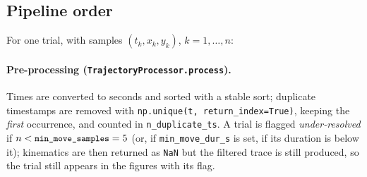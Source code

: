 \documentclass[11pt,a4paper]{article}
\newcommand{\code}[1]{\texttt{\small #1}}
\begin{document}
\subsection{Pipeline order}

For one trial, with samples $(t_k, x_k, y_k)$, $k = 1, \dots, n$:

\paragraph{Pre-processing (\code{TrajectoryProcessor.process}).} Times are
converted to seconds and sorted with a stable sort; duplicate timestamps are
removed with \code{np.unique(t, return\_index=True)}, keeping the \emph{first}
occurrence, and counted in \code{n\_duplicate\_ts}. A trial is flagged
\emph{under-resolved} if $n < \code{min\_move\_samples} = 5$ (or, if
\code{min\_move\_dur\_s} is set, if its duration is below it); kinematics are
then returned as \code{NaN} but the filtered trace is still produced, so the
trial still appears in the figures with its flag.
\end{document}
